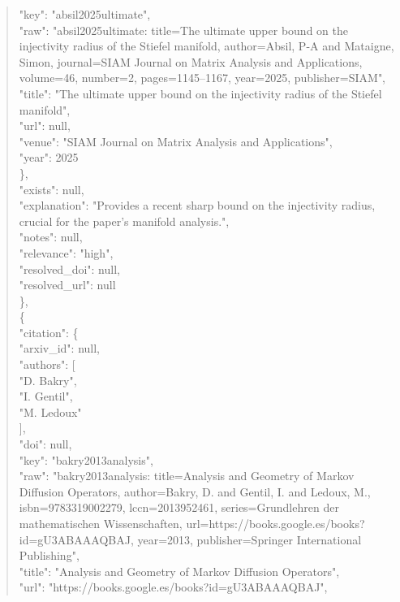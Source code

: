 \documentclass[11pt]{article}
\begin{document}
\begin{quote}
        "key": "absil2025ultimate",\\
        "raw": "absil2025ultimate: title=The ultimate upper bound on the injectivity radius of the Stiefel manifold, author=Absil, P-A and Mataigne, Simon, journal=SIAM Journal on Matrix Analysis and Applications, volume=46, number=2, pages=1145--1167, year=2025, publisher=SIAM",\\
        "title": "The ultimate upper bound on the injectivity radius of the Stiefel manifold",\\
        "url": null,\\
        "venue": "SIAM Journal on Matrix Analysis and Applications",\\
        "year": 2025\\
      \},\\
      "exists": null,\\
      "explanation": "Provides a recent sharp bound on the injectivity radius, crucial for the paper's manifold analysis.",\\
      "notes": null,\\
      "relevance": "high",\\
      "resolved\_doi": null,\\
      "resolved\_url": null\\
    \},\\
    \{\\
      "citation": \{\\
        "arxiv\_id": null,\\
        "authors": [\\
          "D. Bakry",\\
          "I. Gentil",\\
          "M. Ledoux"\\
        ],\\
        "doi": null,\\
        "key": "bakry2013analysis",\\
        "raw": "bakry2013analysis: title=Analysis and Geometry of Markov Diffusion Operators, author=Bakry, D. and Gentil, I. and Ledoux, M., isbn=9783319002279, lccn=2013952461, series=Grundlehren der mathematischen Wissenschaften, url=https://books.google.es/books?id=gU3ABAAAQBAJ, year=2013, publisher=Springer International Publishing",\\
        "title": "Analysis and Geometry of Markov Diffusion Operators",\\
        "url": "https://books.google.es/books?id=gU3ABAAAQBAJ",\\

\end{quote}
\end{document}
